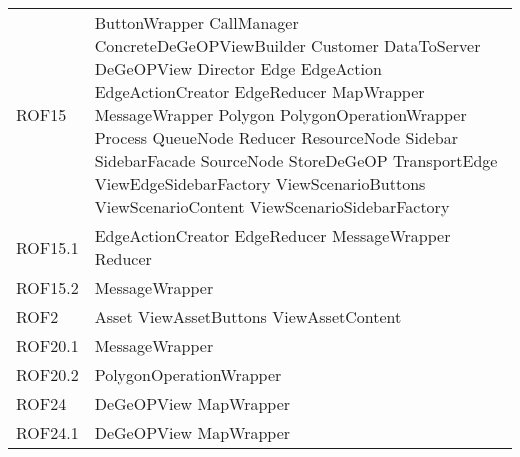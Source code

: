 \begin{longtable}{p{2.5cm}!{\VRule[1pt]}p{5cm}}
		ROF15 & ButtonWrapper \newline CallManager \newline ConcreteDeGeOPViewBuilder \newline Customer \newline DataToServer \newline DeGeOPView \newline Director \newline Edge \newline EdgeAction \newline EdgeActionCreator \newline EdgeReducer \newline MapWrapper \newline MessageWrapper \newline Polygon \newline PolygonOperationWrapper \newline Process \newline QueueNode \newline Reducer \newline ResourceNode \newline Sidebar \newline SidebarFacade \newline SourceNode \newline StoreDeGeOP \newline TransportEdge \newline ViewEdgeSidebarFactory \newline ViewScenarioButtons \newline ViewScenarioContent \newline ViewScenarioSidebarFactory\\
		ROF15.1 & EdgeActionCreator \newline EdgeReducer \newline MessageWrapper \newline Reducer\\
		ROF15.2 & MessageWrapper\\
		ROF2 & Asset \newline ViewAssetButtons \newline ViewAssetContent\\
		ROF20.1 & MessageWrapper\\
		ROF20.2 & PolygonOperationWrapper\\
		ROF24 & DeGeOPView \newline MapWrapper\\
		ROF24.1 & DeGeOPView \newline MapWrapper\\

\end{longtable}
